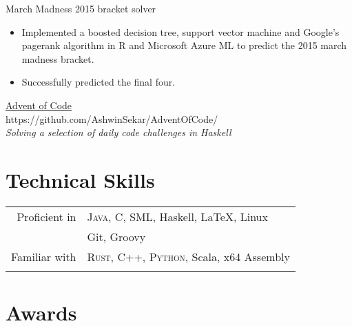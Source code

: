 \documentclass[10pt]{article} %
\begin{document}
{\begin{minipage}[t]{0.44\textwidth}
{\raggedright\large March Madness 2015 bracket solver}

\normalsize
  \begin{itemize}
    \item
      Implemented a boosted decision tree, support vector machine
      and Google’s pagerank algorithm in R and Microsoft Azure
      ML to predict the 2015 march madness bracket.
    \item
      Successfully predicted the final four.
  \end{itemize}

  {\raggedright\large \href{https://github.com/AshwinSekar/AdventOfCode}{Advent of Code} \\ {\small https://github.com/AshwinSekar/AdventOfCode/} \\
  {\small\textit{Solving a selection of daily code challenges in Haskell}}\\[5pt]}



\section{Technical Skills} 

\begin{tabular}{rl}
Proficient in
& \textsc{Java}, C, \textsc{SML}, Haskell, \LaTeX, Linux\\
& Git, Groovy \\

Familiar with  
& \textsc{Rust}, C++, \textsc{Python}, Scala, x64 Assembly \\
& \\

\end{tabular}



\section{Awards} 


\end{minipage}}
\end{document}
